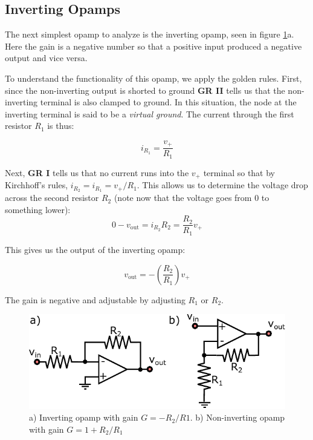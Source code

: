 \documentclass{tufte-book}
\begin{document}
\subsection{Inverting Opamps}
The next simplest opamp to analyze is the inverting opamp, seen in figure \ref{fig:inv_noninv_opamps}a. Here the gain is a negative number so that a positive input produced a negative output and vice versa. 

To understand the functionality of this opamp, we apply the golden rules. First, since the non-inverting output is shorted to ground \textbf{GR II} tells us that the non-inverting terminal is also clamped to ground. In this situation, the node at the inverting terminal is said to be a \textit{virtual ground}. The current through the first resistor $R_1$ is thus:

\begin{equation}
\label{eq:inverting_opamp_deriv_1}
i_{R_1} = \frac{v_+}{R_1}
\end{equation}

Next, \textbf{GR I} tells us that no current runs into the $v_+$ terminal so that by Kirchhoff's rules, $i_{R_2} = i_{R_1} = v_+/R_1$. This allows us to determine the voltage drop across the second resistor $R_2$ (note now that the voltage goes from 0 to something lower):
\begin{equation}
\label{eq:inverting_opamp_deriv_2}
0-v_\text{out} = i_{R_2}R_2 = \frac{R_2}{R_1}v_+
\end{equation}

This gives us the output of the inverting opamp:

\begin{equation}
\label{eq:inverting_opamp}
v_\text{out} = -\left(\frac{R_2}{R_1}\right)v_+
\end{equation}

The gain is negative and adjustable by adjusting $R_1$ or $R_2$.

\begin{figure}[ht]
\caption{a) Inverting opamp with gain $G=-R_2/R1$. b) Non-inverting opamp with gain $G = 1+R_2/R_1$}
\label{fig:inv_noninv_opamps}
	\begin{center}
		\includegraphics[]{Images/inv_noninv_opamps.pdf}
	\end{center}
\end{figure}
\end{document}
